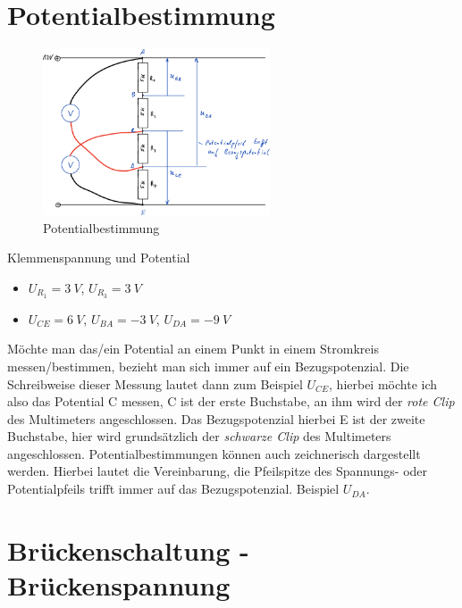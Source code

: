 \section{Potentialbestimmung}\label{potentialbestimmung}

\begin{figure}[!ht]%
\centering
\includegraphics[width=0.6\textwidth]{images/Skizze/28_FT_Potentialbestimmung.pdf}
\caption{Potentialbestimmung}
\end{figure}

Klemmenspannung und Potential

\begin{itemize}
\item
  $U_{R_1} = 3~V$, $U_{R_3} = 3~V$
\item
  $U_{CE} = 6~V$, $U_{BA} = -3~V$, $U_{DA} = -9~V$
\end{itemize}

Möchte man das/ein Potential an einem Punkt in einem Stromkreis
messen/bestimmen, bezieht man sich immer auf ein Bezugspotenzial. Die
Schreibweise dieser Messung lautet dann zum Beispiel $U_{CE}$, hierbei
möchte ich also das Potential C messen, C ist der erste Buchstabe, an
ihm wird der \emph{rote Clip} des Multimeters angeschlossen. Das
Bezugspotenzial hierbei E ist der zweite Buchstabe, hier wird
grundsätzlich der \emph{schwarze Clip} des Multimeters angeschlossen.
Potentialbestimmungen können auch zeichnerisch dargestellt werden.
Hierbei lautet die Vereinbarung, die Pfeilspitze des Spannungs- oder
Potentialpfeils trifft immer auf das Bezugspotenzial. Beispiel
$U_{DA}$.

\newpage

\section{Brückenschaltung -
Brückenspannung}\label{brueckenschaltung-brueckenspannung}

